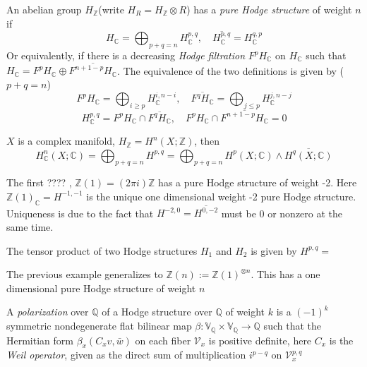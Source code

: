 \documentclass[main]{subfiles}
\begin{document}
\begin{definition}
An abelian group $H_{\mathbb Z}$(write $H_R=H_{\mathbb Z}\otimes R$) has a \textit{pure Hodge structure} of weight $n$ if
\[H_{\mathbb C}=\displaystyle\bigoplus_{p+q=n}H_{\mathbb C}^{p,q},\quad\overline{H_{\mathbb C}^{p,q}}=H_{\mathbb C}^{q,p}\]
Or equivalently, if there is a decreasing \textit{Hodge filtration} $F^pH_{\mathbb C}$ on $H_{\mathbb C}$ such that $H_{\mathbb C}=F^pH_{\mathbb C}\oplus\overline{F^{n+1-p}H_{\mathbb C}}$. The equivalence of the two definitions is given by ($p+q=n$)
\[F^pH_{\mathbb C}=\displaystyle\bigoplus_{i\geq p}H_{\mathbb C}^{i,n-i},\quad \overline{F^qH_{\mathbb C}}=\displaystyle\bigoplus_{j\leq p}H_{\mathbb C}^{j,n-j}\]
\[H_{\mathbb C}^{p,q}=F^pH_{\mathbb C}\cap\overline{F^qH_{\mathbb C}},\quad F^pH_{\mathbb C}\cap\overline{F^{n+1-p}H_{\mathbb C}}=0\]
\end{definition}

\begin{example}
$X$ is a complex manifold, $H_{\mathbb Z}=H^n(X;\mathbb Z)$, then
\[H_{\mathbb C}^n(X;\mathbb C)=\bigoplus_{p+q=n}H^{p,q}=\bigoplus_{p+q=n}H^p(X;\mathbb C)\wedge \overline{H^q(X;\mathbb C)}\]
\end{example}

\begin{example}
The first ???? , $\mathbb Z(1)=(2\pi i)\mathbb Z$ has a pure Hodge structure of weight -2. Here $\mathbb Z(1)_{\mathbb C}=H^{-1,-1}$ is the unique one dimensional weight -2 pure Hodge structure. Uniqueness is due to the fact that $H^{-2,0}=\overline{H^{0,-2}}$ must be 0 or nonzero at the same time.
\end{example}

\begin{definition}
The tensor product of two Hodge structures $H_1$ and $H_2$ is given by $H^{p,q} = $ 
\end{definition}

\begin{example}
The previous example generalizes to $\mathbb Z(n):=\mathbb Z(1)^{\otimes n}$. This has a one dimensional pure Hodge structure of weight $n$
\end{example}

\begin{definition}
A \textit{polarization} over $\mathbb Q$ of a Hodge structure over $\mathbb Q$ of weight $k$ is a $(-1)^k$ symmetric nondegenerate flat bilinear map $\beta:\mathbb V_{\mathbb Q}\times\mathbb V_{\mathbb Q}\to\mathbb Q$ such that the Hermitian form $\beta_x(C_xv,\bar w)$ on each fiber $\mathcal V_x$ is positive definite, here $C_x$ is the \textit{Weil operator}, given as the direct sum of multiplication $i^{p-q}$ on $\mathcal V^{p,q}_x$
\end{definition}
\end{document}
